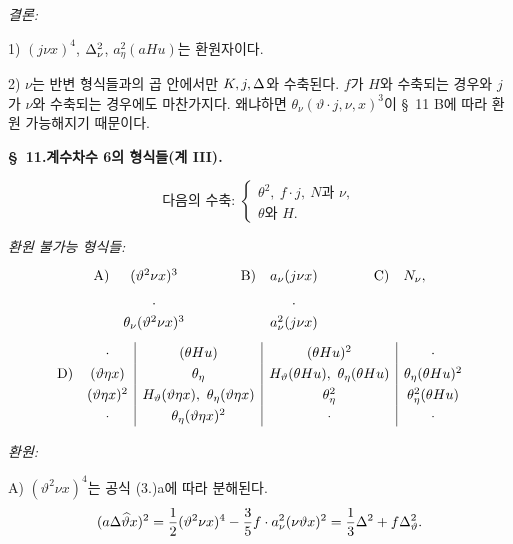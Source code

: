 \noindent\emph{결론:}

1) $(j\nu x)^4$, $\Delta_\nu^2$, $a_\eta^2(aHu)$는 환원자이다.

2) $\nu$는 반변 형식들과의 곱 안에서만 $K,j,\Delta$와 수축된다. $f$가 $H$와 수축되는 경우와 $j$가 $\nu$와 수축되는 경우에도 마찬가지다. 왜냐하면 $\theta_\nu(\vartheta\cdot j,\nu,x)^3$이 \S\ 11 B에 따라 환원 가능해지기 때문이다.

\begin{center}
\textbf{\S\ 11.\quad 계수차수 6의 형식들(계 III).}
\end{center}
\[
\text{다음의 수축: }\left\{\begin{array}{l}
\theta^2,\ f\cdot j,\ N \text{과 }\nu,\\
\theta\text{와 }H.
\end{array}\right.
\]


\noindent\emph{환원 불가능 형식들:}
\[
\renewcommand{\arraystretch}{1.25}
\begin{array}{@{}r@{\quad}c@{\qquad\qquad}r@{\quad}c@{\qquad\qquad}r@{\quad}c@{}}
\text{A)}&(\vartheta^2\nu x)^3&\text{B)}&a_\nu(j\nu x)&\text{C)}&N_\nu,\\[0.45em]
&\cdot&&\cdot&&\\[-0.1em]
&\theta_\nu(\vartheta^2\nu x)^3&&a_\nu^2(j\nu x)&&
\end{array}
\]
\[
\renewcommand{\arraystretch}{1.25}
\begin{array}{@{}r@{\quad}c|c|c|c@{}}
&\cdot&(\theta Hu)&(\theta Hu)^2&\cdot\\
\text{D)}&(\vartheta\eta x)&\theta_\eta&H_\vartheta(\theta Hu),\ \theta_\eta(\theta Hu)&\theta_\eta(\theta Hu)^2\\
&(\vartheta\eta x)^2&H_\vartheta(\vartheta\eta x),\ \theta_\eta(\vartheta\eta x)&\theta_\eta^2&\theta_\eta^2(\theta Hu)\\
&\cdot&\theta_\eta(\vartheta\eta x)^2&\cdot&\cdot
\end{array}
\]

\noindent\emph{환원:}

\noindent A) $(\vartheta^2\nu x)^4$는 공식 (3.)a에 따라 분해된다.
\[
(a\Delta\widehat{\vartheta}x)^2=\frac12(\vartheta^2\nu x)^4-\frac35 f\cdot a_\nu^2(\nu\vartheta x)^2
=\frac13\Delta^2+f\Delta_\vartheta^2.
\]

